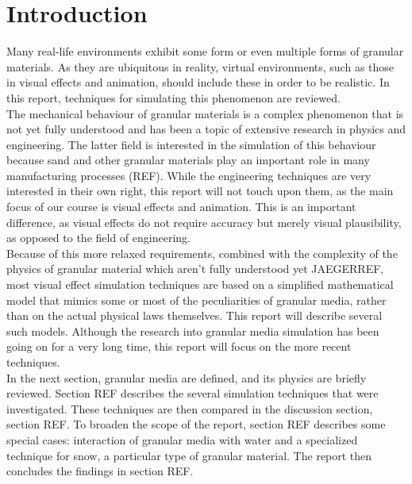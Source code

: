 
\ifx\isEmbedded\undefined

\graphicspath{{../img/}}

\fi

\section{Introduction}
Many real-life environments exhibit some form or even multiple forms of granular materials. As they are ubiquitous in reality, virtual environments, such as those in visual effects and animation, should include these in order to be realistic. In this report, techniques for simulating this phenomenon are reviewed.\\

The mechanical behaviour of granular materials is a complex phenomenon that is not yet fully understood and has been a topic of extensive research in physics and engineering. The latter field is interested in the simulation of this behaviour because sand and other granular materials play an important role in many manufacturing processes (REF). While the engineering techniques are very interested in their own right, this report will not touch upon them, as the main focus of our course is visual effects and animation. This is an important difference, as visual effects do not require accuracy but merely visual plausibility, as opposed to the field of engineering.\\

Because of this more relaxed requirements, combined with the complexity of the physics of granular material which aren't fully understood yet JAEGERREF, most visual effect simulation techniques are based on a simplified mathematical model that mimics some or most of the peculiarities of granular media, rather than on the actual physical laws themselves. This report will describe several such models. Although the research into granular media simulation has been going on for a very long time, this report will focus on the more recent techniques.\\

In the next section, granular media are defined, and its physics are briefly reviewed. Section REF describes the several simulation techniques that were investigated. These techniques are then compared in the discussion section, section REF. To broaden the scope of the report, section REF describes some special cases: interaction of granular media with water and a specialized technique for snow, a particular type of granular material. The report then concludes the findings in section REF.\\

\ifx\isEmbedded\undefined


\pagebreak

\fi